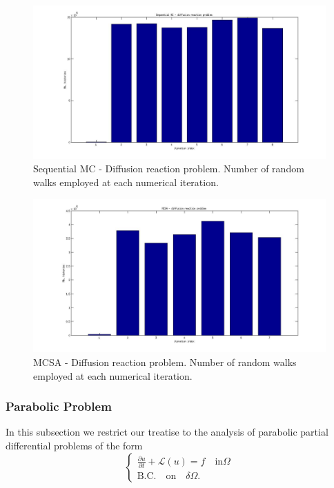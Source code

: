 \begin{figure}[h!]
  \centering
    \includegraphics[width=\textwidth]{SEQ_diffreac.jpg}
      \caption{Sequential MC - Diffusion reaction problem. Number of random
walks
employed at each
numerical iteration.}
\label{SEQ_diffreac}
\end{figure}


\begin{figure}[h!]
  \centering
    \includegraphics[width=\textwidth]{MCSA_diffreac.jpg}
      \caption{MCSA - Diffusion reaction problem. Number of random walks
employed at each
numerical iteration.}
\label{MCSA_diffreac}
\end{figure}

\subsubsection{Parabolic Problem}

In this subsection we restrict our treatise to the analysis of parabolic
partial
differential problems of the form
\begin{equation}
\begin{cases}
 \frac{\partial u }{\partial t} + \mathcal{L}(u)=f \quad \text{in} \Omega \\
\text{B.C.} \quad \text{on}\quad \delta \Omega.
\end{cases}
\label{parabolic}
\end{equation}

